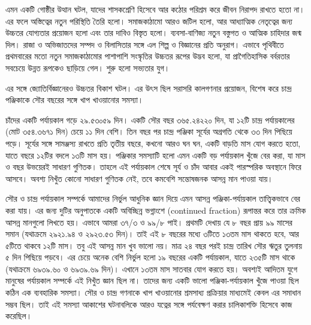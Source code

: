 এমন একটি গোষ্ঠীর উত্থান ঘটল, যাদের শাসকশ্রেণি হিসেবে আর কঠোর পরিশ্রম করে জীবন নিরাপদ রাখতে হতো না। এর ফলে অস্তিত্বের নতুন পরিস্থিতি তৈরি হলো। সমাজকাঠামো আরও জটিল হলো, আর আধ্যাত্মিক নেতৃত্বের জন্য উচ্চতর যোগ্যতার প্রয়োজন হলো এবং তার দাবিও বিস্তৃত হলো। ব্যবসা-বাণিজ্য নতুন বস্তুগত ও আত্মিক চাহিদার জন্ম দিল। রাজা ও অভিজাতদের সম্পদ ও বিলাসিতার সঙ্গে এল শিল্প ও বিজ্ঞানের প্রতি অনুরাগ। এভাবে পৃথিবীতে প্রথমবারের মতো নতুন সমাজকাঠামোর পাশাপাশি সংস্কৃতির উচ্চতর রূপের উদ্ভব হলো, যা প্রাগৈতিহাসিক বর্বরতার সবচেয়ে উন্নত রূপকেও ছাড়িয়ে গেল। শুরু হলো সভ্যতার যুগ।

এর সঙ্গে জ্যোতির্বিজ্ঞানেরও উচ্চতর বিকাশ ঘটল। এর উৎস ছিল সরাসরি কালগণনার প্রয়োজন, বিশেষ করে চান্দ্র পঞ্জিকাকে সৌর বছরের সঙ্গে খাপ খাওয়ানোর সমস্যা।

চাঁদের একটি পর্যায়কাল গড়ে ২৯.৫৩০৫৯ দিন। একটি সৌর বছর ৩৬৫.২৪২২০ দিন, যা ১২টি চান্দ্র পর্যায়কালের (মোট ৩৫৪.৩৬৭১ দিন) চেয়ে ১১ দিন বেশি। তিন বছর পর চান্দ্র পঞ্জিকা সূর্যের অগ্রগতি থেকে ৩৩ দিন পিছিয়ে পড়ে। সূর্যের সঙ্গে সামঞ্জস্য রাখতে প্রতি তৃতীয় বছরে, কখনো আরও ঘন ঘন, একটি বাড়তি মাস যোগ করতে হতো, যাতে বছরে ১২টির বদলে ১৩টি মাস হয়। পঞ্জিকার সমস্যাটি হলো এমন একটি বড় পর্যায়কাল খুঁজে বের করা, যা মাস ও বছর উভয়েরই সাধারণ গুণিতক। তাহলে এই পর্যায়কাল শেষে সূর্য ও চাঁদ আবার একই পারস্পরিক অবস্থানে ফিরে আসবে। অবশ্য নিখুঁত কোনো সাধারণ গুণিতক নেই, তবে কমবেশি সন্তোষজনক আসন্ন মান পাওয়া যায়।

সৌর ও চান্দ্র পর্যায়কাল সম্পর্কে আমাদের নির্ভুল আধুনিক জ্ঞান দিয়ে এমন আসন্ন পঞ্জিকা-পর্যায়কাল তাত্ত্বিকভাবে বের করা যায়। এর জন্য দুটির অনুপাতকে একটি অবিচ্ছিন্ন ভগ্নাংশে (continued fraction) রূপান্তর করে তার ক্রমিক আসন্ন মানগুলো লিখতে হয়। এভাবে আমরা ৩৭/৩ ও ৯৯/৮ পাই। প্রথমটি দেখায় যে ৮ বছর প্রায় ৯৯ মাসের সমান (যথাক্রমে ২৯২১.৯৪ ও ২৯২৩.৫৩ দিন)। তাই এই ৮ বছরের মধ্যে ৩টিতে ১৩তম মাস থাকতে হবে, আর ৫টিতে থাকবে ১২টি মাস। তবু এই আসন্ন মান খুব ভালো নয়। মাত্র ২৪ বছর পরই চান্দ্র তারিখ সৌর ঋতুর তুলনায় ৫ দিন পিছিয়ে পড়বে। এর চেয়ে অনেক বেশি নির্ভুল হলো ১৯ বছরের একটি পর্যায়কাল, যাতে ২৩৫টি মাস থাকে (যথাক্রমে ৬৯৩৯.৬০ ও ৬৯৩৯.৬৯ দিন)। এখানে ১৩তম মাস সাতবার যোগ করতে হয়। অবশ্যই আদিতম যুগে মানুষের পর্যায়কাল সম্পর্কে এই নিখুঁত জ্ঞান ছিল না। তাদের জন্য একটি ভালো পঞ্জিকা-পর্যায়কাল খুঁজে পাওয়া ছিল কঠিন এক ব্যবহারিক সমস্যা। সৌর ও চান্দ্র গণনাকে খাপ খাওয়ানোর শ্রমসাধ্য প্রক্রিয়ার মাধ্যমেই কেবল এর সমাধান সম্ভব ছিল। তাই এই সমস্যা আকাশের ঘটনাবলিকে আরও যত্নের সঙ্গে পর্যবেক্ষণ করার চালিকাশক্তি হিসেবে কাজ করেছিল।

